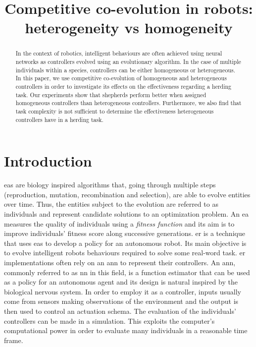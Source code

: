 \documentclass[conference]{IEEEtran}
\begin{document}
 
\title{Competitive co-evolution in robots: \\ heterogeneity vs homogeneity}



\author{
}



\maketitle


\begin{abstract}
In the context of robotics, intelligent behaviours are often achieved using neural networks as controllers evolved using  an evolutionary algorithm.
In the case of multiple individuals within a species, controllers can be either homogeneous or heterogeneous.
In this paper, we use competitive co-evolution of homogeneous and heterogeneous controllers in order to investigate its effects on the effectiveness regarding a herding task.
Our experiments show that shepherds perform better when assigned homogeneous controllers than heterogeneous controllers.
Furthermore, we also find that task complexity is not sufficient to determine the effectiveness heterogeneous controllers have in a herding task.
\end{abstract}


\IEEEpeerreviewmaketitle


\section{Introduction}
\glspl{ea} are biology inspired algorithms that, going through multiple steps (reproduction, mutation, recombination and selection), are able to evolve entities over time.
Thus, the entities subject to the evolution are referred to as individuals and represent candidate solutions to an optimization problem.
An \gls{ea} measures the quality of individuals using a \textit{fitness function} and its aim is to improve individuals' fitness score along successive generations.
\gls{er} is a technique that uses \gls{ea}s to develop a policy for an autonomous robot.
Its main objective is to evolve intelligent robots behaviours required to solve some real-word task.
\gls{er} implementations often rely on an \gls{ann} to represent their controllers.
An \gls{ann}, commonly referred to as \gls{nn} in this field, is a function estimator that can be used as a policy for an autonomous agent and its design is natural inspired by the biological nervous system.
In order to employ it as a controller, inputs usually come from sensors making observations of the environment and the output is then used to control an actuation schema.
The evaluation of the individuals' controllers can be made in a simulation.
This exploits the computer's computational power in order to evaluate many individuals in a reasonable time frame.
\end{document}
